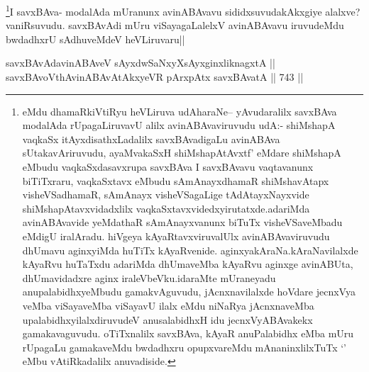 \begin{artha}
\footnote{\stext \stext  eMdu dhamaRkiVtiRyu heVLiruva udAharaNe-- yAvudaralilx savxBAva modalAda rUpagaLiruvavU alilx avinABAvaviruvudu udA:- shiMshapA vaqkaSx itAyxdisathxLadalilx savxBAvadigaLu avinABAva sUtakavAriruvudu, ayaMvakaSxH shiMshapAtAvxtf' eMdare shiMshapA eMbudu vaqkaSxdasavxrupa savxBAva I savxBAvavu vaqtavanunx biTiTxraru, vaqkaSxtavx eMbudu sAmAnayxdhamaR shiMshavAtapx visheVSadhamaR, sAmAnayx visheVSagaLige tAdAtayxNayxvide shiMshapAtavxvidadxlilx vaqkaSxtavxvidedxyirutatxde.adariMda avinABAvavide yeMdathaR sAmAnayxvanunx biTuTx visheVSaveMbadu eMdigU iralAradu. hiVgeya kAyaRtavxviruvalUlx avinABAvaviruvudu dhUmavu aginxyiMda huTiTx kAyaRvenide. aginxyakAraNa.kAraNavilalxde kAyaRvu huTaTxdu adariMda dhUmaveMba kAyaRvu aginxge avinABUta, dhUmavidadxre aginx iraleVbeVku.idaraMte mUraneyadu anupalabidhxyeMbudu gamakvAguvudu, jAcnxnavilalxde hoVdare jecnxVya veMba viSayaveMba viSayavU ilalx eMdu niNaRya jAcnxnaveMba upalabidhxyilalxdiruvudeV anusalabidhxH idu jecnxVyABAvakekx gamakavaguvudu. oTiTxnalilx savxBAva, kAyaR anuPalabidhx eMba mUru rUpagaLu gamakaveMdu bwdadhxru opupxvareMdu mAnaninxlilxTuTx `\stext' eMbu vAtiRkadalilx anuvadiside.}I savxBAva- modalAda mUranunx avinABAvavu sididxsuvudakAkxgiye alalxve? vaniRsuvudu. savxBAvAdi mUru viSayagaLalelxV avinABAvavu iruvudeMdu bwdadhxrU sAdhuveMdeV heVLiruvaru||
\end{artha}


\begin{shl}
savxBAvAdavinABAveV sAyxdwSaNxyXsAyxginxliknagxtA || \\
savxBAvoV\s thAvinABAvAtAkxyeVR pArxpAtx savxBAvatA ||  743 ||  
\end{shl}

